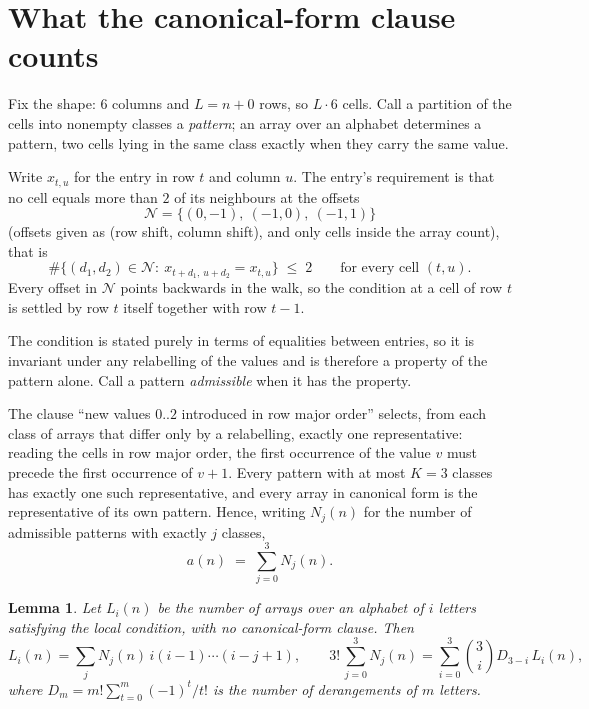 \documentclass[11pt,a4paper]{article}
\theoremstyle{plain}
\newtheorem{lemma}[theorem]{Lemma}
\theoremstyle{definition}
\begin{document}
\section{What the canonical-form clause counts}

Fix the shape: $6$ columns and $L=n+0$ rows, so $L\cdot6$ cells. Call a
partition of the cells into nonempty classes a \emph{pattern}; an array over an alphabet
determines a pattern, two cells lying in the same class exactly when they carry the same
value.

Write $x_{t,u}$ for the entry in row $t$ and column $u$. The
entry's requirement is that no cell equals more than $2$ of its neighbours at the
offsets
\[
\mathcal N=\{(0,-1),\ (-1,0),\ (-1,1)\}
\]
(offsets given as (row shift, column shift), and only cells inside the array count),
that is
\begin{equation}\label{eq:loc}
\#\bigl\{(d_1,d_2)\in\mathcal N:\ x_{t+d_1,\,u+d_2}=x_{t,u}\bigr\}\;\le\;2
\qquad\text{for every cell }(t,u).
\end{equation}
Every offset in $\mathcal N$ points backwards in the walk, so the condition at a cell of
row $t$ is settled by row $t$ itself together with row $t-1$.

The condition is stated purely in terms of equalities between entries, so it is invariant
under any relabelling of the values and is therefore a property of the pattern alone. Call a
pattern \emph{admissible} when it has the property.

The clause ``new values $0..2$ introduced in row major order'' selects, from each class
of arrays that differ only by a relabelling, exactly one representative: reading the cells in
row major order, the first occurrence of the value $v$ must precede the first occurrence of
$v+1$. Every pattern with at most $K=3$ classes has exactly one such representative, and
every array in canonical form is the representative of its own pattern. Hence, writing
$N_j(n)$ for the number of admissible patterns with exactly $j$ classes,
\begin{equation}\label{eq:apat}
a(n)\;=\;\sum_{j=0}^{3}N_j(n).
\end{equation}

\begin{lemma}\label{lem:inv}
Let $L_i(n)$ be the number of arrays over an alphabet of $i$ letters satisfying the local
condition, with no canonical-form clause. Then
\[
L_i(n)=\sum_j N_j(n)\,i(i-1)\cdots(i-j+1),
\qquad
3!\,\sum_{j=0}^{3}N_j(n)=\sum_{i=0}^{3}\binom{3}{i}D_{3-i}\,L_i(n),
\]
where $D_m=m!\sum_{t=0}^{m}(-1)^t/t!$ is the number of derangements of $m$ letters.
\end{lemma}
\end{document}

